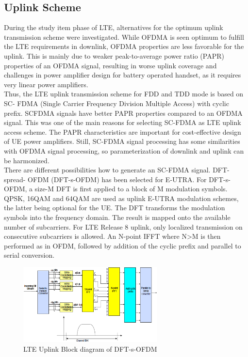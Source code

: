 \subsection{Uplink Scheme}%

During the study item phase of LTE, alternatives for the optimum uplink transmission
scheme were investigated. While OFDMA is seen optimum to fulfill the LTE
requirements in downlink, OFDMA properties are less favorable for the uplink. This is
mainly due to weaker peak-to-average power ratio (PAPR) properties of an OFDMA
signal, resulting in worse uplink coverage and challenges in power amplifier design for
battery operated handset, as it requires very linear power amplifiers.\\

Thus, the LTE uplink transmission scheme for FDD and TDD mode is based on SC-
FDMA (Single Carrier Frequency Division Multiple Access) with cyclic prefix. SCFDMA
signals have better PAPR properties compared to an OFDMA signal. This was
one of the main reasons for selecting SC-FDMA as LTE uplink access scheme. The
PAPR characteristics are important for cost-effective design of UE power amplifiers.
Still, SC-FDMA signal processing has some similarities with OFDMA signal processing,
so parameterization of downlink and uplink can be harmonized.\\

There are different possibilities how to generate an SC-FDMA signal. DFT-spread-
OFDM (DFT-s-OFDM) has been selected for E-UTRA. For
DFT-s-OFDM, a size-M DFT is first applied to a block of M modulation
symbols. QPSK, 16QAM and 64QAM are used as uplink E-UTRA modulation
schemes, the latter being optional for the UE. The DFT transforms the modulation
symbols into the frequency domain. The result is mapped onto the available number
of subcarriers. For LTE Release 8 uplink, only localized transmission on consecutive
subcarriers is allowed. An N-point IFFT where N>M is then performed as in OFDM,
followed by addition of the cyclic prefix and parallel to serial conversion.

\begin{figure}[htbp]
    \centering
    \includegraphics[width=0.65\textwidth]{./figures/uplink_scheme}
    \caption{ LTE Uplink Block diagram of DFT-s-OFDM
    \label{fig:uplinkbd}}
\end{figure}
